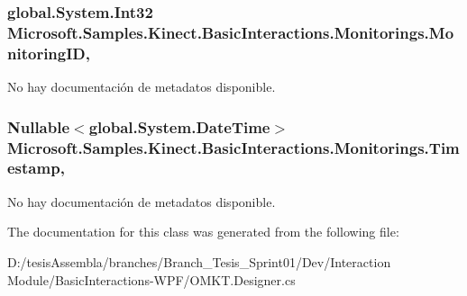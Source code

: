 \hypertarget{class_microsoft_1_1_samples_1_1_kinect_1_1_basic_interactions_1_1_monitorings_aae8415243643475b974fb453546020b8}{
\subsubsection[{Monitoring\-I\-D}]{\setlength{\rightskip}{0pt plus 5cm}global.\-System.\-Int32 Microsoft.\-Samples.\-Kinect.\-Basic\-Interactions.\-Monitorings.\-Monitoring\-I\-D\hspace{0.3cm}{\ttfamily [get]}, {\ttfamily [set]}}}\label{class_microsoft_1_1_samples_1_1_kinect_1_1_basic_interactions_1_1_monitorings_aae8415243643475b974fb453546020b8}


No hay documentación de metadatos disponible. 

\hypertarget{class_microsoft_1_1_samples_1_1_kinect_1_1_basic_interactions_1_1_monitorings_a9bde1ab19faf8ab1247ab306de23f548}{
\subsubsection[{Timestamp}]{\setlength{\rightskip}{0pt plus 5cm}Nullable$<$global.\-System.\-Date\-Time$>$ Microsoft.\-Samples.\-Kinect.\-Basic\-Interactions.\-Monitorings.\-Timestamp\hspace{0.3cm}{\ttfamily [get]}, {\ttfamily [set]}}}\label{class_microsoft_1_1_samples_1_1_kinect_1_1_basic_interactions_1_1_monitorings_a9bde1ab19faf8ab1247ab306de23f548}


No hay documentación de metadatos disponible. 



The documentation for this class was generated from the following file\-:\begin{DoxyCompactItemize}
\item 
D\-:/tesis\-Assembla/branches/\-Branch\-\_\-\-Tesis\-\_\-\-Sprint01/\-Dev/\-Interaction Module/\-Basic\-Interactions-\/\-W\-P\-F/O\-M\-K\-T.\-Designer.\-cs\end{DoxyCompactItemize}
